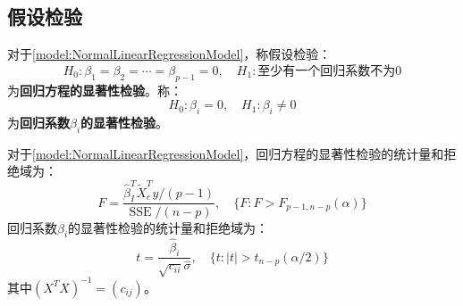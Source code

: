 \subsection{假设检验}
\begin{definition}
	对于\cref{model:NormalLinearRegressionModel}，称假设检验：
	\begin{equation*}
		H_0:\beta_1=\beta_2=\cdots=\beta_{p-1}=0,\quad H_1:\text{至少有一个回归系数不为}0
	\end{equation*}
	为\textbf{回归方程的显著性检验}。称：
	\begin{equation*}
		H_0:\beta_i=0,\quad H_1:\beta_i\ne0
	\end{equation*}
	为\textbf{回归系数$\beta_i$的显著性检验}。
\end{definition}
\begin{theorem}
	对于\cref{model:NormalLinearRegressionModel}，回归方程的显著性检验的统计量和拒绝域为：
	\begin{equation*}
		F=\frac{\hat{\beta}_I^T\tilde{X}_c^Ty/(p-1)}{\operatorname{SSE}/(n-p)},\quad \{F:F>F_{p-1,n-p}(\alpha)\}
	\end{equation*}
	回归系数$\beta_i$的显著性检验的统计量和拒绝域为：
	\begin{equation*}
		t=\frac{\hat{\beta}_i}{\sqrt{c_{ii}}\hat{\sigma}},\quad\{t:|t|>t_{n-p}(\alpha/2)\}
	\end{equation*}
	其中$(X^TX)^{-1}=(c_{ij})$。
\end{theorem}
